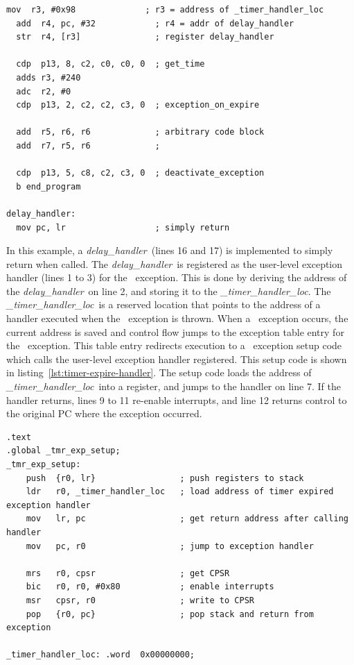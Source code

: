 \begin{lstlisting}[float=h, label=lst:exception-sample,caption=Sample code that triggers a \timerexpired\ exception ]
  mov  r3, #0x98              ; r3 = address of _timer_handler_loc 
  add  r4, pc, #32            ; r4 = addr of delay_handler
  str  r4, [r3]               ; register delay_handler
  
  cdp  p13, 8, c2, c0, c0, 0  ; get_time
  adds r3, #240
  adc  r2, #0
  cdp  p13, 2, c2, c2, c3, 0  ; exception_on_expire
  
  add  r5, r6, r6             ; arbitrary code block
  add  r7, r5, r6             ;
  
  cdp  p13, 5, c8, c2, c3, 0  ; deactivate_exception
  b end_program                       
  
delay_handler:
  mov pc, lr                  ; simply return
\end{lstlisting}

\newcommand{\delayhandler}{\emph{delay\_handler}}
\newcommand{\Delayhandler}{\emph{Delay\_handler}}
\newcommand{\timerhandlerloc}{\emph{\_timer\_handler\_loc}}

In this example, a \delayhandler\ (lines 16 and 17) is implemented to simply return when called.
The \delayhandler\ is registered as the user-level exception handler (lines 1 to 3) for the \timerexpired\ exception.
This is done by deriving the address of the \delayhandler\ on line 2, and storing it to the \timerhandlerloc.
The \timerhandlerloc\ is a reserved location that points to the address of a handler executed when the \timerexpired\ exception is thrown.
When a \timerexpired\ exception occurs, the current address is saved and control flow jumps to the exception table entry for the \timerexpired\ exception.
This table entry redirects execution to a \timerexpired\ exception setup code which calls the user-level exception handler registered.
This setup code is shown in listing~\ref{lst:timer-expire-handler}.
The setup code loads the address of \timerhandlerloc\ into a register, and jumps to the handler on line 7.
If the handler returns, lines 9 to 11 re-enable interrupts, and line 12 returns control to the original PC where the exception occurred.  
\begin{lstlisting}[float=h, label=lst:timer-expire-handler,caption=The \timerexpired\ exception setup code]
.text
.global _tmr_exp_setup;
_tmr_exp_setup:
    push  {r0, lr}                 ; push registers to stack
    ldr   r0, _timer_handler_loc   ; load address of timer expired exception handler
    mov   lr, pc                   ; get return address after calling handler    
    mov   pc, r0                   ; jump to exception handler
    
    mrs   r0, cpsr                 ; get CPSR 
    bic   r0, r0, #0x80            ; enable interrupts
    msr   cpsr, r0                 ; write to CPSR
    pop   {r0, pc}                 ; pop stack and return from exception

_timer_handler_loc: .word  0x00000000;
\end{lstlisting}

